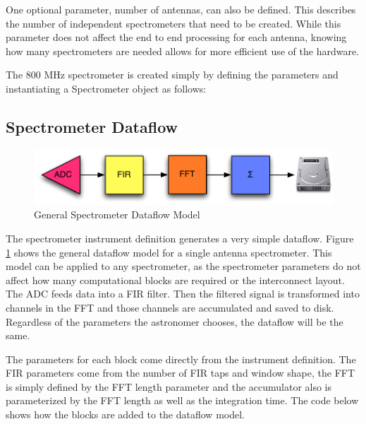 One optional parameter, number of antennas, can also be defined. 
This describes the number of independent spectrometers that need to be created.
While this parameter does not affect the end to end processing for each antenna, knowing how many spectrometers are needed allows for more efficient use of the hardware.

The 800 MHz spectrometer is created simply by defining the parameters and instantiating a Spectrometer object as follows:



\subsection{Spectrometer Dataflow}

\begin{figure}[ht!]
  \centering
    \includegraphics[width=1\textwidth]{Images/C4/spectrometer_dataflow.pdf}
  \caption{General Spectrometer Dataflow Model}
  \label{fig: C4/spectrometer_dataflow.pdf}
\end{figure}

The spectrometer instrument definition generates a very simple dataflow. 
Figure \ref{fig: C4/spectrometer_dataflow.pdf} shows the general dataflow model for a single antenna spectrometer. 
This model can be applied to any spectrometer, as the spectrometer parameters do not affect how many computational blocks are required or the interconnect layout. 
The ADC feeds data into a FIR filter. 
Then the filtered signal is transformed into channels in the FFT and those channels are accumulated and saved to disk. Regardless of the parameters the astronomer chooses, the dataflow will be the same. 

The parameters for each block come directly from the instrument definition. 
The FIR parameters come from the number of FIR taps and window shape, the FFT is simply defined by the FFT length parameter and the accumulator also is parameterized by the FFT length as well as the integration time. 
The code below shows how the blocks are added to the dataflow model.

